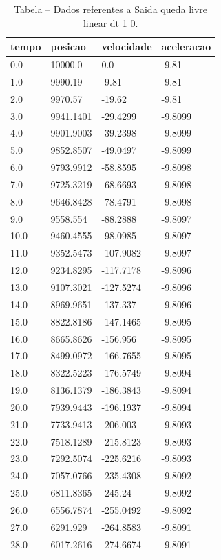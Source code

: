 \begin{table}[H]
\centering
\caption{Tabela – Dados referentes a Saida queda livre linear dt 1 0.}
\label{tab:saida_queda_livre_linear_dt_1_0}
\begin{tabular}{llll}
\toprule
tempo & posicao & velocidade & aceleracao \\
\midrule
0.0 & 10000.0 & 0.0 & -9.81 \\
1.0 & 9990.19 & -9.81 & -9.81 \\
2.0 & 9970.57 & -19.62 & -9.81 \\
3.0 & 9941.1401 & -29.4299 & -9.8099 \\
4.0 & 9901.9003 & -39.2398 & -9.8099 \\
5.0 & 9852.8507 & -49.0497 & -9.8099 \\
6.0 & 9793.9912 & -58.8595 & -9.8098 \\
7.0 & 9725.3219 & -68.6693 & -9.8098 \\
8.0 & 9646.8428 & -78.4791 & -9.8098 \\
9.0 & 9558.554 & -88.2888 & -9.8097 \\
10.0 & 9460.4555 & -98.0985 & -9.8097 \\
11.0 & 9352.5473 & -107.9082 & -9.8097 \\
12.0 & 9234.8295 & -117.7178 & -9.8096 \\
13.0 & 9107.3021 & -127.5274 & -9.8096 \\
14.0 & 8969.9651 & -137.337 & -9.8096 \\
15.0 & 8822.8186 & -147.1465 & -9.8095 \\
16.0 & 8665.8626 & -156.956 & -9.8095 \\
17.0 & 8499.0972 & -166.7655 & -9.8095 \\
18.0 & 8322.5223 & -176.5749 & -9.8094 \\
19.0 & 8136.1379 & -186.3843 & -9.8094 \\
20.0 & 7939.9443 & -196.1937 & -9.8094 \\
21.0 & 7733.9413 & -206.003 & -9.8093 \\
22.0 & 7518.1289 & -215.8123 & -9.8093 \\
23.0 & 7292.5074 & -225.6216 & -9.8093 \\
24.0 & 7057.0766 & -235.4308 & -9.8092 \\
25.0 & 6811.8365 & -245.24 & -9.8092 \\
26.0 & 6556.7874 & -255.0492 & -9.8092 \\
27.0 & 6291.929 & -264.8583 & -9.8091 \\
28.0 & 6017.2616 & -274.6674 & -9.8091 \\

\end{tabular}
\end{table}
